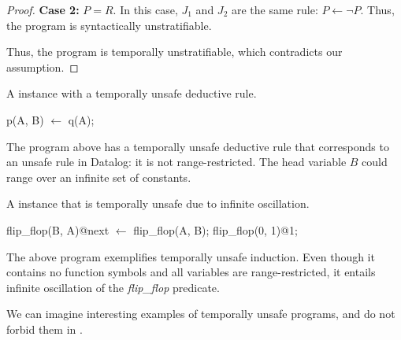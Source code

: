 \begin{proof}
{\bf Case 2: }$P = R$.  In this case, $J_1$ and $J_2$ are the same rule: $P
\leftarrow \lnot P$.  Thus, the program is syntactically unstratifiable.

Thus, the program is temporally unstratifiable, which contradicts our
assumption.
\end{proof}

\begin{example}
A \slang instance with a temporally unsafe deductive rule.


\begin{Dedalus}
p(A, B) \(\leftarrow\) q(A);
\end{Dedalus}

The program above has a temporally unsafe deductive rule that corresponds to an
unsafe rule in Datalog: it is not range-restricted.  The head variable $B$
could range over an infinite set of constants.
\end{example}


\begin{example} 
A \slang instance that is temporally unsafe due to infinite oscillation.

\begin{Dedalus}
flip\_flop(B, A)@next \(\leftarrow\) flip\_flop(A, B);
flip\_flop(0, 1)@1;
\end{Dedalus}

The above program exemplifies temporally unsafe induction. Even though it
contains no function symbols and all variables are range-restricted, it
entails infinite oscillation of the \emph{flip\_flop} predicate.  
\end{example}

We can imagine interesting examples of temporally unsafe programs, and do not forbid them
in \slang. 


















